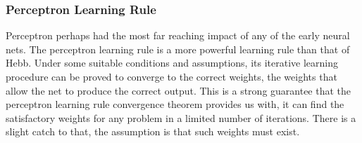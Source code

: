 \documentclass[a4paper,12pt]{report}
\begin{document}
\subsubsection*{Perceptron Learning Rule}
Perceptron perhaps had the most far reaching impact of any of the early neural nets. The perceptron learning rule is a more powerful 
learning rule than that of Hebb. Under some suitable conditions and assumptions, its iterative learning procedure can be proved to converge 
to the correct weights, the weights that allow the net to produce the correct output. This is a strong guarantee that the perceptron learning rule convergence theorem
provides us with, it can find the satisfactory weights for any problem in a limited number of iterations. There is a slight catch to that, the assumption is that such weights must exist.
\end{document}
